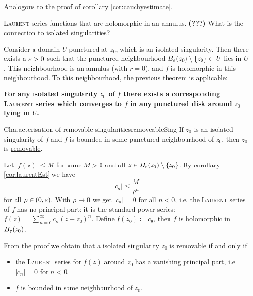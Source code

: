 \documentclass[a4paper,english]{article}
\begin{document}
\begin{pr}
    Analogous to the proof of corollary \ref{cor:cauchyestimate}.
\end{pr}

\textsc{Laurent} series functions that are holomorphic in an annulus. \textbf{(???)}
What is the connection to isolated singularities?

Consider a domain $U$ punctured at $z_0$, which is an isolated singularity.
Then there exists a $\varepsilon > 0$ such that the punctured neighbourhood $B_{\varepsilon}(z_0) \setminus \{ z_0 \} \subset U$ lies in $U$.
This neighbourhood is an annulus (with $r = 0$), and $f$ is holomorphic in this neighbourhood.
To this neighbourhood, the previous theorem is applicable:

\textbf{For any isolated singularity $z_0$ of $f$ there exists a corresponding \textsc{Laurent} series which converges to $f$ in any punctured disk around $z_0$ lying in $U$.}

\begin{thm}{Characterisation of removable singularities}{removeableSing}
    If $z_0$ is an isolated singularity of $f$ and $f$ is bounded in some punctured neighbourhood of $z_0$, then $z_0$ is \hyperref[defn:remove]{removable}. 
\end{thm}

\begin{pr}
    Let $| f(z) | \le M$ for some $M > 0$ and all $z \in B_{\varepsilon}(z_0) \setminus \{ z_0 \}$.
    By corollary \ref{cor:laurentEst} we have
    \begin{equation*}
        | c_n | \le \frac{M}{\rho^n}
    \end{equation*}
    for all $\rho \in (0, \varepsilon)$.
    With $\rho \to 0$ we get $| c_n | = 0$ for all $n < 0$, i.e. the \textsc{Laurent} series of $f$ has no principal part; it is the standard power series: $f(z) = \sum_{n = 0}^{\infty} c_n (z - z_0)^n$.
    Define $f(z_0) \coloneqq c_0$, then $f$ is holomorphic in $B_{\varepsilon}(z_0)$.
\end{pr}


\begin{remark} \label{remark:removable}
    From the proof we obtain that a isolated singularity $z_0$ is removable if and only if
\begin{itemize}
    \item 
    the \textsc{Laurent} series for $f(z)$ around $z_0$ has a vanishing principal part, i.e. $| c_n | = 0$ for $n < 0$.
    
    \item
    $f$ is bounded in some neighbourhood of $z_0$.
\end{itemize}
\end{remark}
\end{document}
